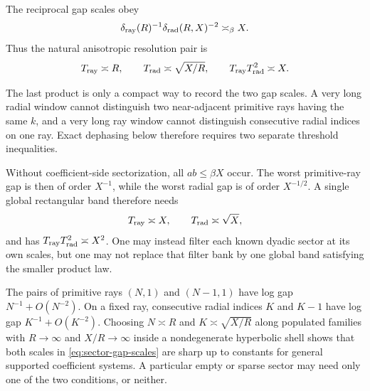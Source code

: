 \begin{corollary}
\label{cor:sector-resolution-invariant}
The reciprocal gap scales obey
\begin{equation}
 \delta_{\rm ray}(R)^{-1}
 \delta_{\rm rad}(R,X)^{-2}\asymp_\beta X.
 \label{eq:sector-resolution-invariant}
\end{equation}
Thus the natural anisotropic resolution pair is
\begin{equation}
 T_{\rm ray}\asymp R,
 \qquad
 T_{\rm rad}\asymp\sqrt{X/R},
 \qquad
 T_{\rm ray}T_{\rm rad}^2\asymp X.
 \label{eq:anisotropic-resolution-pair}
\end{equation}
\end{corollary}

\begin{remark}
The last product is only a compact way to record the two gap scales.
A very long radial window cannot distinguish two near-adjacent primitive
rays having the same $k$, and a very long ray window cannot distinguish
consecutive radial indices on one ray.  Exact dephasing below therefore
requires two separate threshold inequalities.
\end{remark}

\begin{remark}
Without coefficient-side sectorization, all $ab\leq\beta X$ occur.
The worst primitive-ray gap is then of order $X^{-1}$, while the worst
radial gap is of order $X^{-1/2}$.  A single global rectangular band
therefore needs
\[
 T_{\rm ray}\asymp X,
 \qquad T_{\rm rad}\asymp\sqrt X,
\]
and has $T_{\rm ray}T_{\rm rad}^2\asymp X^2$.  One may instead filter
each known dyadic sector at its own scales, but one may not replace that
filter bank by one global band satisfying the smaller product law.
\end{remark}

\begin{remark}
The pairs of primitive rays $(N,1)$ and $(N-1,1)$ have log gap
$N^{-1}+O(N^{-2})$.  On a fixed ray, consecutive radial indices $K$ and
$K-1$ have log gap $K^{-1}+O(K^{-2})$.  Choosing $N\asymp R$ and
$K\asymp\sqrt{X/R}$ along populated families with
$R\to\infty$ and $X/R\to\infty$ inside a nondegenerate hyperbolic shell
shows that both scales in \eqref{eq:sector-gap-scales} are sharp up to
constants for general supported coefficient systems.  A particular
empty or sparse sector may need only one of the two conditions, or
neither.
\end{remark}
